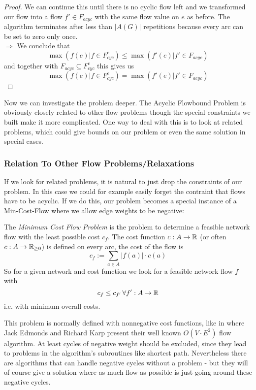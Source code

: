 \begin{proof}
We can continue this until there is no cyclic flow left and we transformed our flow into a flow $f'\in F_{acyc}$ with 
the same flow value on $e$ as before. The algorithm terminates after less than $|A(G)|$ repetitions because every arc 
can be set to zero only once.\\
$\Rightarrow $ We conclude that $$\max(f(e)|f\in F_{cyc}^e)\le \max(f'(e)|f'\in F_{acyc})$$ and together with 
$F_{acyc}\subseteq F_{cyc}^e $ this gives us
$$\max(f(e)|f\in F_{cyc}^e)= \max(f'(e)|f'\in F_{acyc}) $$
\end{proof}


Now we can investigate the problem deeper. The Acyclic Flowbound Problem is obviously closely related to other flow 
problems though the special constraints we built make it more complicated. One way to deal with this is to look at 
related problems, which could give bounds on our problem or even the same solution in special cases.

\subsubsection{Relation To Other Flow Problems/Relaxations}
\label{sect:mincostflow}
If we look for related problems, it is natural to just drop the constraints of our problem. In this case we could for 
example easily forget the contraint that flows have to be acyclic. If we do this, our problem becomes a special 
instance of a Min-Cost-Flow where we allow edge weights to be negative:

\begin{definition}\label{def:mincostflow}
 The \textit{Minimum Cost Flow Problem} is the problem to determine a feasible network flow with the least possible 
cost $c_f$. The cost function $c:A\to \mathbb{R}$ (or often $c:A\to \mathbb{R}_{\ge 0}$) is defined on every arc, the cost of the flow 
is $$c_f := \sum_{a\in A}|f(a)|\cdot c(a)$$ So for a given network and cost function we look for a feasible network 
flow $f$ with $$c_f\le c_{f'}\,\forall f':A\to \mathbb{R}$$ i.e. with minimum overall costs.
\end{definition}

This problem is normally defined with nonnegative cost functions, like in \cite{EdmondsKarp1972} where 
Jack Edmonds and Richard Karp present their well known $O(V\cdot E^2)$ flow algorithm. At least cycles of negative 
weight should be excluded, since they lead to problems in the algorithm's subroutines like shortest path. Nevertheless 
there are algorithms that can handle negative cycles without a problem - but they will of course give a solution 
where as much flow as possible is just going around these negative cycles. 

